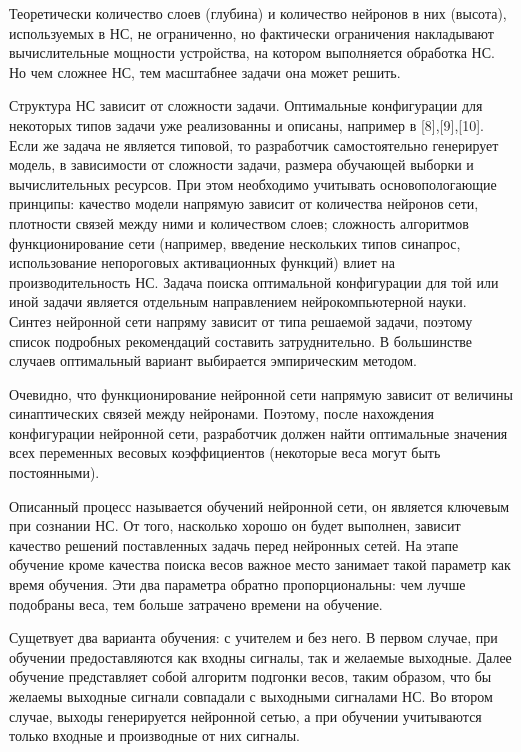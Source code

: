 \documentclass[a4paper,english,russian]{G2-105}
\begin{document}
\par Теоретически количество слоев (глубина) и количество нейронов в них (высота), используемых в НС, не ограниченно, но фактически ограничения накладывают вычислительные мощности устройства, на котором выполняется обработка НС. Но чем сложнее НС, тем масштабнее задачи она может решить. 
\par Структура НС зависит от сложности задачи. Оптимальные конфигурации для некоторых типов задачи уже реализованны и описаны, например в [8],[9],[10]. Если же задача не является типовой, то разработчик самостоятельно генерирует модель, в зависимости от сложности задачи, размера обучающей выборки и вычислительных ресурсов. При этом необходимо учитывать основопологающие принципы: качество модели напрямую зависит от количества нейронов сети, плотности связей между ними и количеством слоев; сложность алгоритмов функционирование сети (например, введение нескольких типов синапрос, использование непороговых активационных функций) влиет на производительность НС. Задача поиска оптимальной конфигурации для той или иной задачи является отдельным направлением нейрокомпьютерной науки. Синтез нейронной сети напряму зависит от типа решаемой задачи, поэтому список подробных рекомендаций составить затруднительно. В большинстве случаев оптимальный вариант выбирается эмпирическим методом.
\par Очевидно, что функционирование нейронной сети напрямую зависит от величины синаптических связей между нейронами. Поэтому, после нахождения конфигурации нейронной сети, разработчик должен найти оптимальные значения всех переменных весовых коэффициентов (некоторые веса могут быть постоянными).
\par Описанный процесс называется обучений нейронной сети, он является ключевым при сознании НС. От того, насколько хорошо он будет выполнен, зависит качество решений поставленных задачь перед нейронных сетей. На этапе обучение кроме качества поиска весов важное место занимает такой параметр как время обучения. Эти два параметра обратно пропорциональны: чем лучше подобраны веса, тем больше затрачено времени на обучение.
\par Сущетвует два варианта обучения: с учителем и без него. В первом случае, при обучении предоставляются как входны сигналы, так и желаемые выходные. Далее обучение представляет собой алгоритм подгонки весов, таким образом, что бы желаемы выходные сигнали совпадали с выходными сигналами НС. Во втором случае, выходы генерируется нейронной сетью, а при обучении учитываются только входные и производные от них сигналы.
\end{document}
